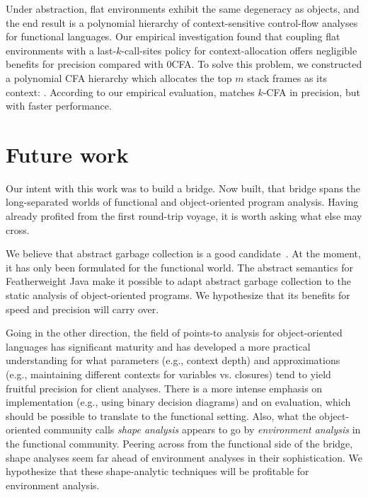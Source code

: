 Under abstraction, flat environments exhibit the same degeneracy as
objects, and the end result is a polynomial hierarchy of
context-sensitive control-flow analyses for functional languages.
Our empirical investigation found that coupling flat environments with
a last-$k$-call-sites policy for context-allocation offers negligible
benefits for precision compared with 0CFA.
To solve this problem, we constructed a polynomial CFA hierarchy which
allocates the top $m$ stack frames as its context: \nCFA{}.
According to our empirical evaluation, \nCFA{} matches $k$-CFA in
precision, but with faster performance.


\section{Future work}
\label{sec:future}

Our intent with this work was to build a bridge.
Now built, that bridge spans the long-separated worlds of
functional and object-oriented program analysis.
Having already profited from the first round-trip voyage, it is worth asking what else
may cross.

We believe that abstract garbage collection is a good candidate~\cite{mattmight:Might:2006:GammaCFA}.
At the moment, it has only been formulated for the functional world.
The abstract semantics for Featherweight Java make it possible to
adapt abstract garbage collection to the static analysis of
object-oriented programs.
We hypothesize that its benefits for speed and precision will carry
over.

Going in the other direction, the field of points-to analysis for
object-oriented languages has significant maturity and has developed a
more practical understanding for what parameters (e.g., context depth)
and approximations (e.g., maintaining different contexts for variables
vs. closures) tend to yield fruitful precision for client analyses.
There is a more intense emphasis on implementation (e.g., using binary
decision diagrams) and on evaluation, which should
be possible to translate to the functional setting.
Also, what the object-oriented community calls
\emph{shape analysis} appears to go by \emph{environment analysis} in
the functional community.
Peering across from the functional side of the bridge, shape analyses
seem far ahead of environment analyses in their sophistication.
We hypothesize that these shape-analytic techniques will be profitable
for environment analysis.




